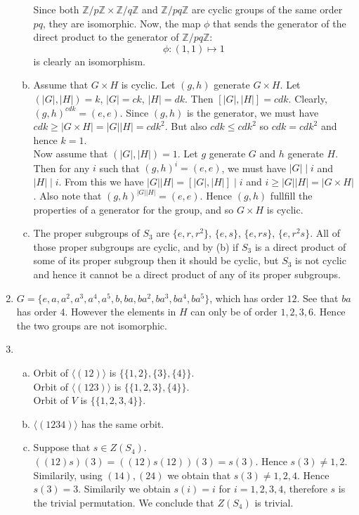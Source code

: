 \documentclass[A4paper,12pt]{article}
\theoremstyle{definition}
\numberwithin{equation}{section}
\begin{document}
\begin{enumerate}[1)]
\begin{enumerate}[(a)]
                Since both $\mathbb{Z}/p\mathbb{Z} \times \mathbb{Z}/q\mathbb{Z}$ and $\mathbb{Z}/pq\mathbb{Z}$ are cyclic groups of the same order $pq$, they are isomorphic.
                Now, the map $\phi$ that sends the generator of the direct product to the generator of $\mathbb{Z}/pq\mathbb{Z}$:
$$\phi: (1, 1) \mapsto 1$$ is clearly an isomorphism.
            \item
                Assume that $G \times H$ is cyclic. Let $(g, h)$ generate $G \times H$. 
                Let $(|G|, |H|) = k$, $|G| = ck$, $|H|=dk$. Then $[|G|, |H|] = cdk$.
                Clearly, $(g, h)^{cdk} = (e, e)$. Since $(g, h)$ is the generator, we must have $cdk \ge |G \times H| = |G||H| = cdk^2$.
                But also $cdk \le cdk^2$ so $cdk = cdk^2$ and hence $k=1$.
                \\
                Now assume that $(|G|,|H|)= 1$. 
                Let $g$ generate $G$ and $h$ generate $H$.
                Then for any $i$ such that $(g, h)^i= (e, e)$, we must have $|G| \mid i$ and $|H| \mid i$.
                From this we have $|G||H| = [|G|, |H|] \mid i$ and $i \ge |G||H| = |G \times H|$. 
                Also note that $(g, h)^{|G||H|} = (e,e)$. Hence $(g, h)$ fullfill the properties of a generator for the group, and so $G \times H$ is cyclic.
            \item
                The proper subgroups of $S_3$ are $\{e, r, r^2\}$, $\{e, s\}$, $\{e, rs\}$, $\{e, r^2s\}$. All of those proper subgroups are cyclic, and by (b) if $S_3$ is a direct product of some of its proper subgroup then it should be cyclic, but $S_3$ is not cyclic  and hence it cannot be a direct product of any of its proper subgroups.
        \end{enumerate}
    \item
        $G = \{e, a, a^2, a^3, a^4, a^5, b, ba, ba^2, ba^3, ba^4, ba^5\}$, which has order $12$.  
        See that $ba$ has order $4$. However the elements in $H$ can only be of order $1, 2, 3, 6$. Hence the two groups are not isomorphic.
    \item
        \begin{enumerate}[(a)]
            \item
                Orbit of $\langle (12) \rangle$ is $\{\{1, 2\}, \{3\}, \{4\}\}$.\\
                Orbit of $\langle (123) \rangle$ is $\{\{1, 2, 3\}, \{4\}\}$.\\
                Orbit of $V$ is $\{\{1, 2, 3, 4\}\}$.
            \item
                $\langle (1234) \rangle$ has the same orbit.
            \item
                Suppose that $s \in Z(S_4)$. 
                $((12)s) (3) = ((12)s(12)) (3) = s(3)$. 
                Hence $s(3) \neq 1, 2$. Similarily, using $(14), (24)$ we obtain that $s(3) \neq 1, 2, 4$. Hence $s(3) = 3$. 
                Similarily we obtain $s(i) = i$ for $i = 1, 2, 3, 4$, therefore $s$ is the trivial permutation. We conclude that $Z(S_4)$ is trivial.


\end{enumerate}
\end{enumerate}
\end{document}
